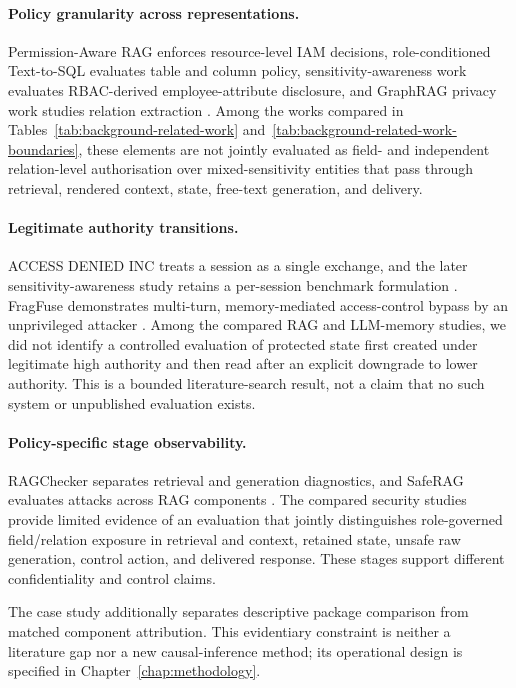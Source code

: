 \paragraph{Policy granularity across representations.}
Permission-Aware RAG enforces resource-level IAM decisions, role-conditioned Text-to-SQL evaluates table and column policy, sensitivity-awareness work evaluates RBAC-derived employee-attribute disclosure, and GraphRAG privacy work studies relation extraction \citep{jeong2025permissionrag,klisura2026role,fazlija2025accessdenied,fazlija2026sensitivity,liu2026graphragprivacy}. Among the works compared in Tables~\ref{tab:background-related-work} and~\ref{tab:background-related-work-boundaries}, these elements are not jointly evaluated as field- and independent relation-level authorisation over mixed-sensitivity entities that pass through retrieval, rendered context, state, free-text generation, and delivery.

\paragraph{Legitimate authority transitions.}
ACCESS DENIED INC treats a session as a single exchange, and the later sensitivity-awareness study retains a per-session benchmark formulation \citep{fazlija2025accessdenied,fazlija2026sensitivity}. FragFuse demonstrates multi-turn, memory-mediated access-control bypass by an unprivileged attacker \citep{rao2026fragfuse}. Among the compared RAG and LLM-memory studies, we did not identify a controlled evaluation of protected state first created under legitimate high authority and then read after an explicit downgrade to lower authority. This is a bounded literature-search result, not a claim that no such system or unpublished evaluation exists.

\paragraph{Policy-specific stage observability.}
RAGChecker separates retrieval and generation diagnostics, and SafeRAG evaluates attacks across RAG components \citep{ru2024ragchecker,liang2025saferag}. The compared security studies provide limited evidence of an evaluation that jointly distinguishes role-governed field/relation exposure in retrieval and context, retained state, unsafe raw generation, control action, and delivered response. These stages support different confidentiality and control claims.

The case study additionally separates descriptive package comparison from matched component attribution. This evidentiary constraint is neither a literature gap nor a new causal-inference method; its operational design is specified in Chapter~\ref{chap:methodology}.

